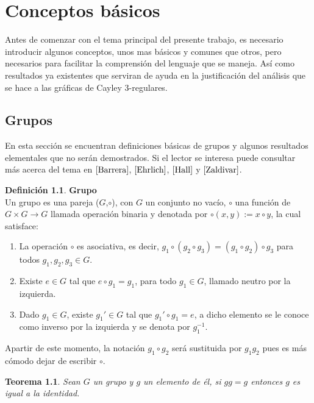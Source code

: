 \documentclass[11pt]{book}
\newtheorem{theorem}{Teorema}
\theoremstyle{definition}
\newtheorem{definition}{Definición}
\begin{document}
\tableofcontents




\chapter{Conceptos básicos}

Antes de comenzar con el tema principal del presente trabajo, es
necesario introducir algunos conceptos, unos mas básicos y comunes
que otros, pero necesarios para facilitar la comprensión del
lenguaje que se maneja. Así como resultados ya existentes que
serviran de ayuda en la justificación del análisis que se hace a las
gráficas de Cayley 3-regulares.


\section{Grupos}

En esta sección se encuentran definiciones básicas de grupos y
algunos resultados elementales que no serán demostrados. Si
el lector se interesa puede consultar más acerca del tema en
$\cite{Barrera}$, $\cite{Ehrlich}$, $\cite{Hall}$ y $\cite{Zaldivar}$.

\begin{definition}{\textbf{Grupo}}\\ Un grupo es una
pareja ($G$,$\circ$), con $G$ un conjunto no vacío, $\circ$ una
función de $G\times G \rightarrow G$ llamada operación binaria y
denotada por $\circ (x,y):=x\circ y$, la cual satisface:

\begin{enumerate}
\item La operación $\circ$ es asociativa, es decir, $g_1\circ
  (g_2\circ g_3)=(g_1 \circ g_2)\circ g_3$ para todos
  $g_1,g_2,g_3\in G$.
\item Existe $e\in G$ tal que $e\circ g_1=g_1$, para todo
  $g_1\in G$, llamado neutro por la izquierda.
\item Dado $g_1\in G$, existe $g_1'\in G$ tal que $g_1'\circ g_1
  = e$, a dicho elemento se le conoce como inverso por la
  izquierda y se denota por $g_1^{-1}$.
\end{enumerate}
\end{definition}


Apartir de este momento, la notación $g_1\circ g_2$ ser\'a
sustituida por $g_1g_2$ pues es m\'as cómodo dejar de escribir
$\circ$. 



\begin{theorem}\label{gg=g}
  Sean $G$ un grupo y $g$ un elemento de él, si $gg=g$ entonces $g$ es
  igual a la identidad.
\end{theorem}
\end{document}

